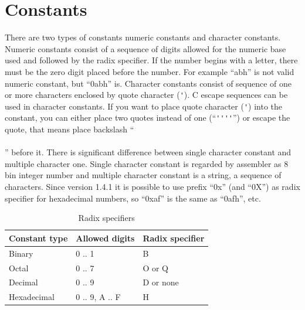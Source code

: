 \documentclass[a4paper,twoside,12pt]{book}
\newcommand{\mysmallfont}{\fontsize{8pt}{10pt} \selectfont{}}
\begin{document}
	\section{Constants}
		There are two types of constants numeric constants and character constants. Numeric constants consist of a sequence of digits allowed for the numeric base used and followed by the radix specifier. If the number begins with a letter, there must be the zero digit placed before the number. For example ``abh'' is not valid numeric constant, but ``0abh'' is. Character constants consist of sequence of one or more characters enclosed by quote character (\verb"'"). C escape sequences can be used in character constants. If you want to place quote character (\verb"'") into the constant, you can either place two quotes instead of one (``\verb"''''"'') or escape the quote, that means place backslash ``\\\\'' before it. There is significant difference between single character constant and multiple character one. Single character constant is regarded by assembler as 8 bin integer number and multiple character constant is a string, a sequence of characters. Since version 1.4.1 it is possible to use prefix ``0x'' (and ``0X'') as radix specifier for hexadecimal numbers, so ``0xaf'' is the same as ``0afh'', etc.

		\begin{table}[h!]
			\mysmallfont{}
			\centering{}
			\begin{tabular}{|l|l|l|}
				\hline
				Constant type	& Allowed digits	& Radix specifier	\\
				\hline
				Binary		& 0 .. 1		& B		\\
				Octal		& 0 .. 7		& O or Q	\\
				Decimal		& 0 .. 9		& D or none	\\
				Hexadecimal	& 0 .. 9, A .. F	& H		\\
				\hline
			\end{tabular}
			\caption{Radix specifiers}
		\end{table}
\end{document}
